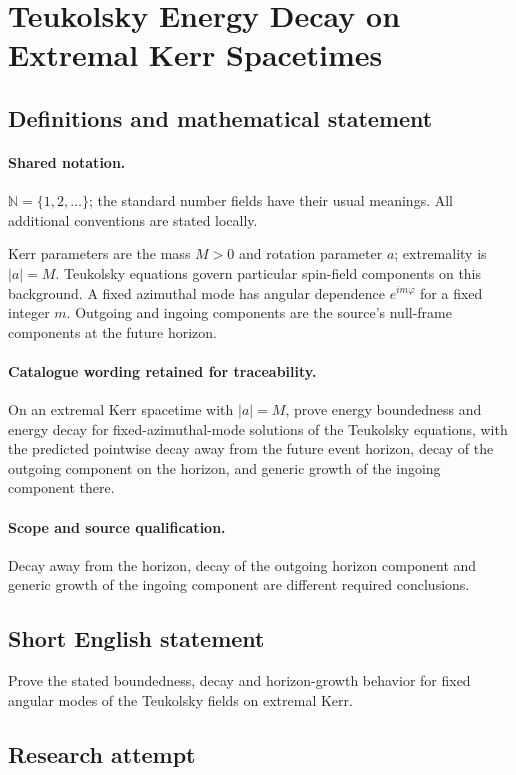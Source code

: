 \documentclass[11pt]{article}
\begin{document}
\section{Teukolsky Energy Decay on Extremal Kerr Spacetimes}\label{statement}

\subsection{Definitions and mathematical statement}

\paragraph{Shared notation.}$\mathbb N=\{1,2,\ldots\}$; the standard number fields have their usual meanings. All additional conventions are stated locally.


Kerr parameters are the mass $M>0$ and rotation parameter $a$; extremality is $|a|=M$. Teukolsky equations govern particular spin-field components on this background. A fixed azimuthal mode has angular dependence $e^{im\varphi}$ for a fixed integer $m$. Outgoing and ingoing components are the source's null-frame components at the future horizon.

\paragraph{Catalogue wording retained for traceability.}
On an extremal Kerr spacetime with $|a|=M$, prove energy boundedness and energy decay for fixed-azimuthal-mode solutions of the Teukolsky equations, with the predicted pointwise decay away from the future event horizon, decay of the outgoing component on the horizon, and generic growth of the ingoing component there.

\paragraph{Scope and source qualification.}Decay away from the horizon, decay of the outgoing horizon component and generic growth of the ingoing component are different required conclusions.
\subsection{Short English statement}
Prove the stated boundedness, decay and horizon-growth behavior for fixed angular modes of the Teukolsky fields on extremal Kerr.
\subsection{Research attempt}
\end{document}
